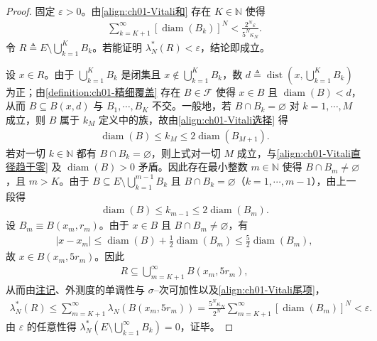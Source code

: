 \documentclass[../../main.tex]{subfiles}%
\begin{document}
\begin{proof}
固定 $\varepsilon>0$。由\eqref{align:ch01-Vitali和} 存在 $K\in\mathbb{N}$ 使得
\begin{align}
\sum_{k=K+1}^\infty[\operatorname{diam}(B_k)]^N<\frac{2^N\varepsilon}{5^N\kappa_N}. \label{align:ch01-Vitali尾项}
\end{align}
令 $R\triangleq E\setminus\bigcup_{k=1}^KB_k$。若能证明 $\lambda_N^*(R)<\varepsilon$，结论即成立。

设 $x\in R$。由于 $\bigcup_{k=1}^KB_k$ 是闭集且 $x\notin\bigcup_{k=1}^KB_k$，数 $d\triangleq\operatorname{dist}(x,\bigcup_{k=1}^KB_k)$ 为正；由\cref{definition:ch01-精细覆盖} 存在 $B\in\mathcal{F}$ 使得 $x\in B$ 且 $\operatorname{diam}(B)<d$，从而 $B\subseteq B(x,d)$ 与 $B_1,\cdots ,B_K$ 不交。一般地，若 $B\cap B_k=\varnothing$ 对 $k=1,\cdots ,M$ 成立，则 $B$ 属于 $k_M$ 定义中的族，故由\eqref{align:ch01-Vitali选择} 得
\begin{align*}
\operatorname{diam}(B)\leqslant k_M\leqslant2\operatorname{diam}(B_{M+1}).
\end{align*}
若对一切 $k\in\mathbb{N}$ 都有 $B\cap B_k=\varnothing$，则上式对一切 $M$ 成立，与\eqref{align:ch01-Vitali直径趋于零} 及 $\operatorname{diam}(B)>0$ 矛盾。因此存在最小整数 $m\in\mathbb{N}$ 使得 $B\cap B_m\neq\varnothing$，且 $m>K$。由于 $B\subseteq E\setminus\bigcup_{k=1}^{m-1}B_k$ 且 $B\cap B_k=\varnothing$（$k=1,\cdots ,m-1$），由上一段得
\begin{align}
\operatorname{diam}(B)\leqslant k_{m-1}\leqslant2\operatorname{diam}(B_m). \label{align:ch01-Vitali直径估计}
\end{align}
设 $B_m\equiv B(x_m,r_m)$。由于 $x\in B$ 且 $B\cap B_m\neq\varnothing$，有
\begin{align*}
|x-x_m|\leqslant\operatorname{diam}(B)+\frac{1}{2}\operatorname{diam}(B_m)\leqslant\frac{5}{2}\operatorname{diam}(B_m),
\end{align*}
故 $x\in B(x_m,5r_m)$。因此
\begin{align*}
R\subseteq\bigcup_{m=K+1}^\infty B(x_m,5r_m),
\end{align*}
从而由\hyperref[remark:ch01-位似]{注记}、外测度的单调性与 $\sigma$--次可加性以及\eqref{align:ch01-Vitali尾项}，
\begin{align*}
\lambda_N^*(R)\leqslant\sum_{m=K+1}^\infty\lambda_N(B(x_m,5r_m))=\frac{5^N\kappa_N}{2^N}\sum_{m=K+1}^\infty[\operatorname{diam}(B_m)]^N<\varepsilon.
\end{align*}
由 $\varepsilon$ 的任意性得 $\lambda_N^*(E\setminus\bigcup_{k=1}^\infty B_k)=0$，证毕。
\end{proof}
\end{document}
